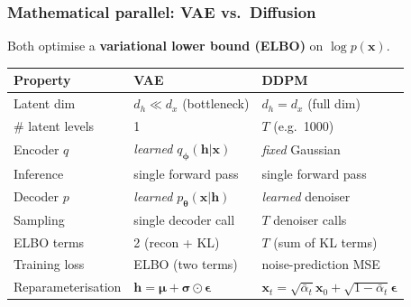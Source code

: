 \documentclass{beamer}
\begin{document}
\begin{frame}
\frametitle{Mathematical parallel: VAE vs.\ Diffusion}

Both optimise a \textbf{variational lower bound (ELBO)} on $\log p(\bm{x})$.

\begin{center}
\begin{tabular}{lll}
\toprule
\textbf{Property} & \textbf{VAE} & \textbf{DDPM} \\
\midrule
Latent dim & $d_h \ll d_x$ (bottleneck) & $d_h = d_x$ (full dim) \\
\# latent levels & 1 & $T$ (e.g.\ 1000) \\
Encoder $q$ & \emph{learned} $q_{\bm{\phi}}(\bm{h}|\bm{x})$ & \emph{fixed} Gaussian \\
Inference & single forward pass & single forward pass \\
Decoder $p$ & \emph{learned} $p_{\bm{\theta}}(\bm{x}|\bm{h})$ & \emph{learned} denoiser \\
Sampling & single decoder call & $T$ denoiser calls \\
ELBO terms & 2 (recon + KL) & $T$ (sum of KL terms) \\
Training loss & ELBO (two terms) & noise-prediction MSE \\
Reparameterisation & $\bm{h}=\bm{\mu}+\bm{\sigma}\odot\bm{\epsilon}$ & $\bm{x}_t=\sqrt{\bar\alpha_t}\bm{x}_0+\sqrt{1-\bar\alpha_t}\bm{\epsilon}$ \\
\bottomrule
\end{tabular}
\end{center}
\end{frame}
\end{document}
